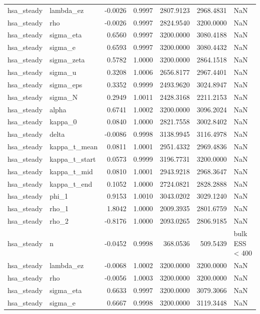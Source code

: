 \begin{tabular}{llrrrrl}
hsa\_steady & lambda\_ez & -0.0026 & 0.9997 & 2807.9123 & 2968.4831 & NaN \\
hsa\_steady & rho & -0.0026 & 0.9997 & 2824.9540 & 3200.0000 & NaN \\
hsa\_steady & sigma\_eta & 0.6560 & 0.9997 & 3200.0000 & 3080.4188 & NaN \\
hsa\_steady & sigma\_e & 0.6593 & 0.9997 & 3200.0000 & 3080.4432 & NaN \\
hsa\_steady & sigma\_zeta & 0.5782 & 1.0000 & 3200.0000 & 2864.1518 & NaN \\
hsa\_steady & sigma\_u & 0.3208 & 1.0006 & 2656.8177 & 2967.4401 & NaN \\
hsa\_steady & sigma\_eps & 0.3352 & 0.9999 & 2493.9620 & 3024.8947 & NaN \\
hsa\_steady & sigma\_N & 0.2949 & 1.0011 & 2428.3168 & 2211.2153 & NaN \\
hsa\_steady & alpha & 0.6741 & 1.0002 & 3200.0000 & 3096.2024 & NaN \\
hsa\_steady & kappa\_0 & 0.0840 & 1.0000 & 2821.7558 & 3002.8402 & NaN \\
hsa\_steady & delta & -0.0086 & 0.9998 & 3138.9945 & 3116.4978 & NaN \\
hsa\_steady & kappa\_t\_mean & 0.0811 & 1.0001 & 2951.4332 & 2969.4836 & NaN \\
hsa\_steady & kappa\_t\_start & 0.0573 & 0.9999 & 3196.7731 & 3200.0000 & NaN \\
hsa\_steady & kappa\_t\_mid & 0.0810 & 1.0001 & 2943.9218 & 2968.3647 & NaN \\
hsa\_steady & kappa\_t\_end & 0.1052 & 1.0000 & 2724.0821 & 2828.2888 & NaN \\
hsa\_steady & phi\_1 & 0.9153 & 1.0010 & 3043.0202 & 3029.1240 & NaN \\
hsa\_steady & rho\_1 & 1.8042 & 1.0000 & 2009.3935 & 2801.6759 & NaN \\
hsa\_steady & rho\_2 & -0.8176 & 1.0000 & 2093.0265 & 2806.9185 & NaN \\
hsa\_steady & n & -0.0452 & 0.9998 & 368.0536 & 509.5439 & bulk ESS < 400 \\
hsa\_steady & lambda\_ez & -0.0068 & 1.0002 & 3200.0000 & 3200.0000 & NaN \\
hsa\_steady & rho & -0.0056 & 1.0003 & 3200.0000 & 3200.0000 & NaN \\
hsa\_steady & sigma\_eta & 0.6633 & 0.9997 & 3200.0000 & 3079.3066 & NaN \\
hsa\_steady & sigma\_e & 0.6667 & 0.9998 & 3200.0000 & 3119.3448 & NaN \\

\end{tabular}
